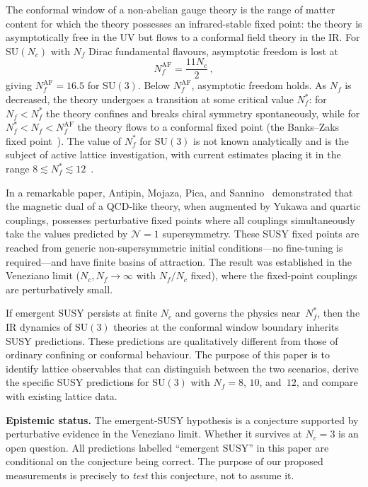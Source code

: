 \documentclass[11pt,a4paper]{article}
\theoremstyle{plain}
\theoremstyle{definition}
\theoremstyle{remark}
\newcommand{\Nc}{N_{\!c}}
\newcommand{\Nf}{N_{\!f}}
\newcommand{\Nfstar}{\Nf^*}
\newcommand{\SU}[1]{\mathrm{SU}(#1)}
\newcommand{\AF}{\ensuremath{\mathrm{AF}}}
\begin{document}
The conformal window of a non-abelian gauge theory is the range of
matter content for which the theory possesses an infrared-stable fixed
point: the theory is asymptotically free in the UV but flows to a
conformal field theory in the IR.  For $\SU{\Nc}$ with $\Nf$ Dirac
fundamental flavours, asymptotic freedom is lost at
\begin{equation}\label{eq:AF-bound}
  \Nf^{\AF} = \frac{11\Nc}{2}\,,
\end{equation}
giving $\Nf^{\AF} = 16.5$ for $\SU{3}$.  Below $\Nf^{\AF}$, asymptotic
freedom holds.  As $\Nf$ is decreased, the theory undergoes a transition
at some critical value $\Nfstar$: for $\Nf < \Nfstar$ the theory
confines and breaks chiral symmetry spontaneously, while for
$\Nfstar < \Nf < \Nf^{\AF}$ the theory flows to a conformal fixed point
(the Banks--Zaks fixed point~\cite{BZ1982,Caswell1974}).  The value of
$\Nfstar$ for $\SU{3}$ is not known analytically and is the subject of
active lattice investigation, with current estimates placing it in the
range $8 \lesssim \Nfstar \lesssim 12$~\cite{Hasenbusch2017,
Appelquist2016,Aoki2014,Fodor2012}.

In a remarkable paper, Antipin, Mojaza, Pica, and
Sannino~\cite{AMPS2013} demonstrated that the magnetic dual of a
QCD-like theory, when augmented by Yukawa and quartic couplings,
possesses perturbative fixed points where all couplings simultaneously
take the values predicted by $\mathcal{N}=1$ supersymmetry.  These
SUSY fixed points are reached from generic non-supersymmetric initial
conditions---no fine-tuning is required---and have finite basins of
attraction.  The result was established in the Veneziano limit
($\Nc, \Nf \to \infty$ with $\Nf/\Nc$ fixed), where the fixed-point
couplings are perturbatively small.

If emergent SUSY persists at finite $\Nc$ and governs the physics
near~$\Nfstar$, then the IR dynamics of $\SU{3}$ theories at the
conformal window boundary inherits SUSY predictions.  These predictions
are qualitatively different from those of ordinary confining or
conformal behaviour.  The purpose of this paper is to identify lattice
observables that can distinguish between the two scenarios, derive
the specific SUSY predictions for $\SU{3}$ with $\Nf = 8$, $10$,
and~$12$, and compare with existing lattice data.

\textbf{Epistemic status.}  The emergent-SUSY hypothesis is a
conjecture supported by perturbative evidence in the Veneziano limit.
Whether it survives at $\Nc = 3$ is an open question.  All predictions
labelled ``emergent SUSY'' in this paper are conditional on the
conjecture being correct.  The purpose of our proposed measurements is
precisely to \emph{test} this conjecture, not to assume it.
\end{document}
